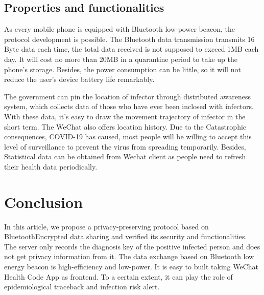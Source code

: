 \documentclass[11pt,en]{elegantpaper}
\begin{document}
\subsection{Properties and functionalities}
As every mobile phone is equipped with Bluetooth low-power beacon, the protocol development is possible. The Bluetooth data transmission transmits 16 Byte data each time, the total data received is not supposed to exceed 1MB each day. It will cost no more than 20MB in a quarantine period to take up the phone's storage. Besides, the power consumption can be little, so it will not reduce the user's device battery life remarkably.

The government can pin the location of infector through distributed awareness system, which collects data of those who have ever been inclosed with infectors. With these data, it's easy to draw the movement trajectory of infector in the short term. The WeChat also offers location history. Due to the Catastrophic consequences, COVID-19 has caused, most people will be willing to accept this level of surveillance to prevent the virus from spreading temporarily. Besides, Statistical data can be obtained from Wechat client as people need to refresh their health data periodically. 



\section{Conclusion}
In this article, we propose a privacy-preserving protocol based on BluetoothEncrypted data sharing and verified its security and functionalities. The server only records the diagnosis key of the positive infected person and does not get privacy information from it. The data exchange based on Bluetooth low energy beacon is high-efficiency and low-power. It is easy to built taking WeChat Health Code App as frontend. To a certain extent, it can play the role of epidemiological traceback and infection risk alert.

\end{document}
